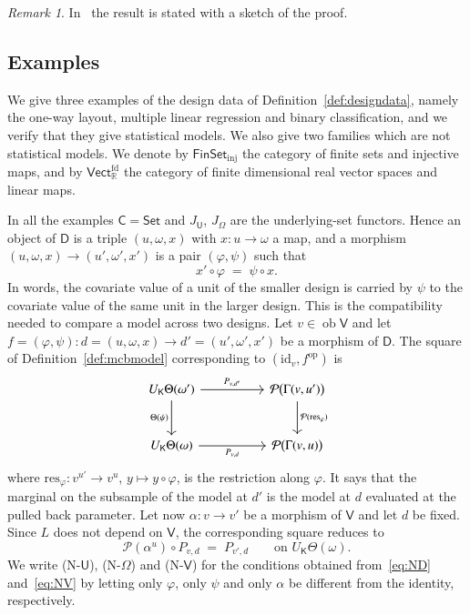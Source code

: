 \documentclass[11pt,a4paper]{article}
\theoremstyle{plain}
\theoremstyle{definition}
\theoremstyle{remark}
\newtheorem{remark}[theorem]{Remark}
\newcommand{\cat}[1]{\mathsf{#1}}
\newcommand{\catU}{\cat{U}}
\newcommand{\catV}{\cat{V}}
\newcommand{\catO}{\cat{\Omega}}
\newcommand{\catD}{\cat{D}}
\newcommand{\catK}{\cat{K}}
\newcommand{\Set}{\cat{Set}}
\newcommand{\FinSet}{\cat{FinSet}}
\newcommand{\Prb}{\mathcal{P}}
\newcommand{\op}{\mathrm{op}}
\newcommand{\id}{\mathrm{id}}
\newcommand{\R}{\mathbb{R}}
\newcommand{\Vect}{\cat{Vect}}
\newcommand{\res}{\mathrm{res}}
\DeclareMathOperator{\ob}{ob}
\begin{document}
\begin{remark}\label{rem:brons-sketch}
In~\cite[pp.~1280,~1282]{brons_discussion_2002} the result is stated with a
sketch of the proof.
\end{remark}

\subsection{Examples}\label{sec:worked}

We give three examples of the design data of Definition~\ref{def:designdata},
namely the one-way layout, multiple linear regression and binary
classification, and we verify that they give statistical models. We also give
two families which are not statistical models. We denote by
$\FinSet_{\mathrm{inj}}$ the category of finite sets and injective maps, and by
$\Vect_{\R}^{\mathrm{fd}}$ the category of finite dimensional real vector
spaces and linear maps.

In all the examples $\cat{C} = \Set$ and $J_{\catU}$, $J_{\catO}$ are the
underlying-set functors. Hence an object of $\catD$ is a triple $(u,\omega,x)$
with $x \colon u \to \omega$ a map, and a morphism
$(u,\omega,x)\to(u',\omega',x')$ is a pair $(\varphi,\psi)$ such that
\begin{equation}\label{eq:commacond}
x' \circ \varphi \;=\; \psi \circ x .
\end{equation}
In words, the covariate value of a unit of the smaller design is carried by
$\psi$ to the covariate value of the same unit in the larger design. This is
the compatibility needed to compare a model across two designs.
Let $v \in \ob\catV$ and let
$f = (\varphi,\psi) \colon d=(u,\omega,x) \to d'=(u',\omega',x')$ be a morphism
of $\catD$. The square of Definition~\ref{def:mcbmodel} corresponding to
$(\id_{v},f^{\op})$ is
\begin{equation}\label{eq:ND}
\begin{tikzcd}[column sep=5em, row sep=2.6em]
U_{\catK}\Theta(\omega') \arrow[r,"P_{v,d'}"] \arrow[d,"\Theta(\psi)"'] &
\Prb\bigl(\Gamma(v,u')\bigr) \arrow[d,"\Prb(\res_{\varphi})"] \\
U_{\catK}\Theta(\omega) \arrow[r,"P_{v,d}"'] &
\Prb\bigl(\Gamma(v,u)\bigr)
\end{tikzcd}
\end{equation}
where $\res_{\varphi} \colon v^{u'} \to v^{u}$, $y \mapsto y\circ\varphi$, is
the restriction along $\varphi$. It says that the marginal on the subsample of
the model at $d'$ is the model at $d$ evaluated at the pulled back parameter.
Let now $\alpha \colon v \to v'$ be a morphism of $\catV$ and let $d$ be fixed.
Since $L$ does not depend on $\catV$, the corresponding square reduces to
\begin{equation}\label{eq:NV}
\Prb(\alpha^{u}) \circ P_{v,d} \;=\; P_{v',d}
\qquad\text{on } U_{\catK}\Theta(\omega).
\end{equation}
We write (N-$\catU$), (N-$\catO$) and (N-$\catV$) for the conditions obtained
from~\eqref{eq:ND} and~\eqref{eq:NV} by letting only $\varphi$, only $\psi$ and
only $\alpha$ be different from the identity, respectively.
\end{document}
